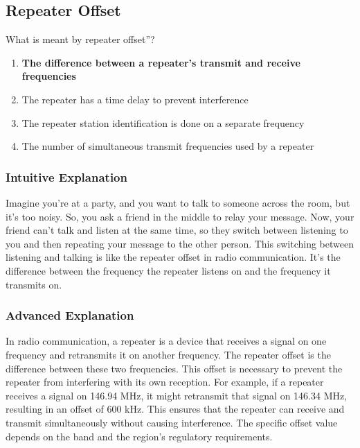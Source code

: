 \subsection{Repeater Offset}
\label{T2A07}

\begin{tcolorbox}[colback=gray!10!white,colframe=black!75!black,title=T2A07]
What is meant by repeater offset”?
\begin{enumerate}[noitemsep]
    \item \textbf{The difference between a repeater’s transmit and receive frequencies}
    \item The repeater has a time delay to prevent interference
    \item The repeater station identification is done on a separate frequency
    \item The number of simultaneous transmit frequencies used by a repeater
\end{enumerate}
\end{tcolorbox}

\subsubsection{Intuitive Explanation}
Imagine you're at a party, and you want to talk to someone across the room, but it's too noisy. So, you ask a friend in the middle to relay your message. Now, your friend can't talk and listen at the same time, so they switch between listening to you and then repeating your message to the other person. This switching between listening and talking is like the repeater offset in radio communication. It's the difference between the frequency the repeater listens on and the frequency it transmits on.

\subsubsection{Advanced Explanation}
In radio communication, a repeater is a device that receives a signal on one frequency and retransmits it on another frequency. The repeater offset is the difference between these two frequencies. This offset is necessary to prevent the repeater from interfering with its own reception. For example, if a repeater receives a signal on 146.94 MHz, it might retransmit that signal on 146.34 MHz, resulting in an offset of 600 kHz. This ensures that the repeater can receive and transmit simultaneously without causing interference. The specific offset value depends on the band and the region's regulatory requirements.

